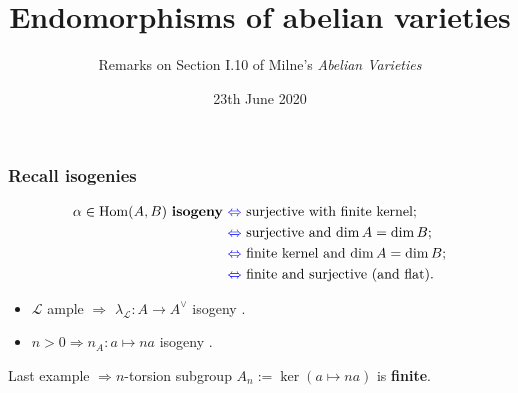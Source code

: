 \documentclass[notheorems, hyperref]{beamer}
\title[Endomorphisms of abelian varieties]{Endomorphisms of abelian varieties}
\author{Remarks on Section I.10 of Milne's \textit{Abelian Varieties}}
\institute{University of Freiburg}
\date{23th June 2020}
\theoremstyle{darkgreentheorem}
\theoremstyle{darkbluedefinition}
\theoremstyle{darkredexample}
\theoremstyle{remark}
\DeclareMathOperator{\Hom}{Hom}
\renewcommand{\L}{\mathcal{L}}
\newcommand{\dual}{^{\vee}}
\begin{document}
 
\frame{\titlepage}

\begin{frame}
    \frametitle{Recall isogenies}
    \begin{tcolorbox}[colback=blue!5!white,colframe=blue!75!black,title=Definition]
	\vspace{-6mm}
	\begin{align*}
	    \alpha\in \Hom(A,B) \text{ \textbf{isogeny} } & \text{\textcolor{blue}{$\Leftrightarrow$} surjective with finite kernel;} \\ 
	    & \text{\textcolor{blue}{$\Leftrightarrow$} surjective and $\dim{A}=\dim{B}$;} \\
	    & \text{\textcolor{blue}{$\Leftrightarrow$} finite kernel and $\dim{A}=\dim{B}$;} \\
	    & \text{\textcolor{blue}{$\Leftrightarrow$} finite and surjective (and flat).}
	\end{align*}
    \end{tcolorbox}
    \pause
    \begin{tcolorbox}[colback=red!5!white,colframe=red!75!black,title=Examples]
	\begin{itemize}
	    \item $\L$ ample $\Rightarrow$ $\lambda_{\L}\colon A\to A\dual$ isogeny \cite[Prop.~8.1]{mil08}.
	    \item $n>0\Rightarrow n_{A}\colon a\mapsto na$ isogeny \cite[Thm.~7.2]{mil08}.
	\end{itemize}
    \end{tcolorbox}
    \pause
    Last example $\Rightarrow n$-torsion subgroup $A_{n}:=\ker(a\mapsto na)$ is \textbf{finite}.
\end{frame}
\end{document}
